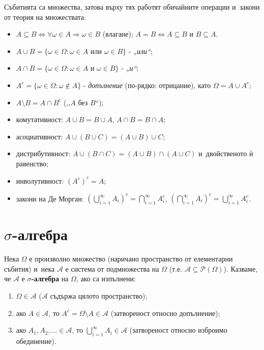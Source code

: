 \begin{rembox}
Събитията са множества, затова върху тях работят обичайните
операции и~закони от теория на множествата:
\begin{itemize}[nosep]
  \item $A \subseteq B \iff \forall \omega \in A \Rightarrow \omega \in B$ (влагане); $A = B \iff A\subseteq B \text{ и~} B \subseteq A$.
  \item $A \cup B = \{\omega \in \Omega : \omega \in A \text{ или } \omega \in B\}$ - \emph{„или“};
  \item $A \cap B = \{\omega \in \Omega : \omega \in A \text{ и~} \omega \in B\}$ - \emph{„и“};
  \item $A^c = \{\omega \in \Omega : \omega \notin A\}$ - \emph{допълнение} (по-рядко: отрицание), като $\Omega = A \cup A^c$;
  \item $A \setminus B = A \cap B^c$ (,,$A$ без $B$``);
  \item комутативност: $A\cup B = B\cup A$, $A\cap B = B\cap A$;
  \item асоциативност: $A\cup(B\cup C) = (A\cup B)\cup C$;
  \item дистрибутивност: $A\cup(B\cap C) = (A\cup B)\cap(A\cup C)$ и~двойственото ѝ равенство;
  \item инволутивност: $(A^c)^c = A$;
  \item закони на Де Морган: $\left(\bigcup_{i=1}^{\infty} A_i\right)^c = \bigcap_{i=1}^{\infty} A_i^c$, \quad $\left(\bigcap_{i=1}^{\infty} A_i\right)^c = \bigcup_{i=1}^{\infty} A_i^c$.
\end{itemize}
\end{rembox}

\section{\texorpdfstring{$\sigma$}{Sigma}-алгебра}

\begin{defbox}
Нека $\Omega$ е произволно множество (наричано пространство от
елементарни събития) и~нека $\mathcal{A}$ е система от подмножества
на $\Omega$ (т.е. $\mathcal{A} \subseteq \mathcal{P}(\Omega)$).
Казваме, че $\mathcal{A}$ е \textbf{$\sigma$-алгебра} на $\Omega$, ако
са изпълнени:
\begin{enumerate}[label=\arabic*)]
  \item $\Omega \in \mathcal{A}$ ($\mathcal{A}$ съдържа цялото пространство);
  \item ако $A \in \mathcal{A}$, то $A^c = \Omega \setminus A \in \mathcal{A}$ (затвореност относно допълнение);
  \item ако $A_1, A_2, \dots \in \mathcal{A}$, то $\bigcup_{i=1}^{\infty} A_i \in \mathcal{A}$ (затвореност относно изброимо обединение).
\end{enumerate}
\end{defbox}

